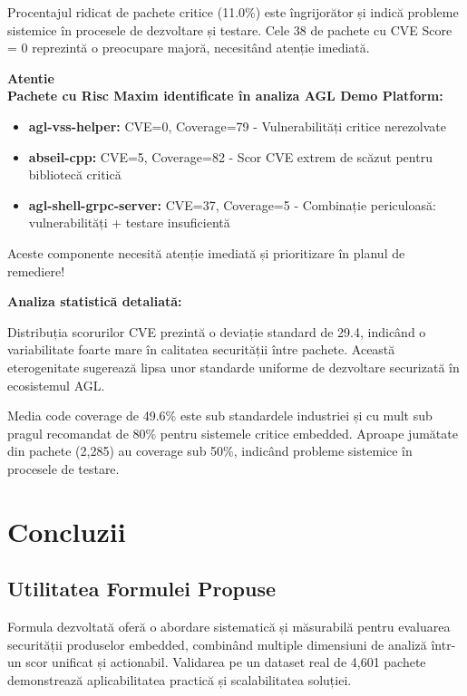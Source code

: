 \documentclass[12pt,a4paper]{article}
\newenvironment{warningbox}{%
\begin{leftbar}
\color{black}
\textbf{Atentie}\\[0.5em]
}{%
\end{leftbar}
}
\begin{document}
Procentajul ridicat de pachete critice (11.0\%) este îngrijorător și indică probleme sistemice în procesele de dezvoltare și testare. Cele 38 de pachete cu CVE Score = 0 reprezintă o preocupare majoră, necesitând atenție imediată.

\begin{warningbox}
\textbf{Pachete cu Risc Maxim identificate în analiza AGL Demo Platform:}

\begin{itemize}
\item \textbf{agl-vss-helper:} CVE=0, Coverage=79 - Vulnerabilități critice nerezolvate
\item \textbf{abseil-cpp:} CVE=5, Coverage=82 - Scor CVE extrem de scăzut pentru bibliotecă critică
\item \textbf{agl-shell-grpc-server:} CVE=37, Coverage=5 - Combinație periculoasă: vulnerabilități + testare insuficientă
\end{itemize}

Aceste componente necesită atenție imediată și prioritizare în planul de remediere!
\end{warningbox}

\textbf{Analiza statistică detaliată:}

Distribuția scorurilor CVE prezintă o deviație standard de 29.4, indicând o variabilitate foarte mare în calitatea securității între pachete. Această eterogenitate sugerează lipsa unor standarde uniforme de dezvoltare securizată în ecosistemul AGL.

Media code coverage de 49.6\% este sub standardele industriei și cu mult sub pragul recomandat de 80\% pentru sistemele critice embedded. Aproape jumătate din pachete (2,285) au coverage sub 50\%, indicând probleme sistemice în procesele de testare.

\section{Concluzii}

\subsection{Utilitatea Formulei Propuse}

Formula dezvoltată oferă o abordare sistematică și măsurabilă pentru evaluarea securității produselor embedded, combinând multiple dimensiuni de analiză într-un scor unificat și actionabil. Validarea pe un dataset real de 4,601 pachete demonstrează aplicabilitatea practică și scalabilitatea soluției.
\end{document}
